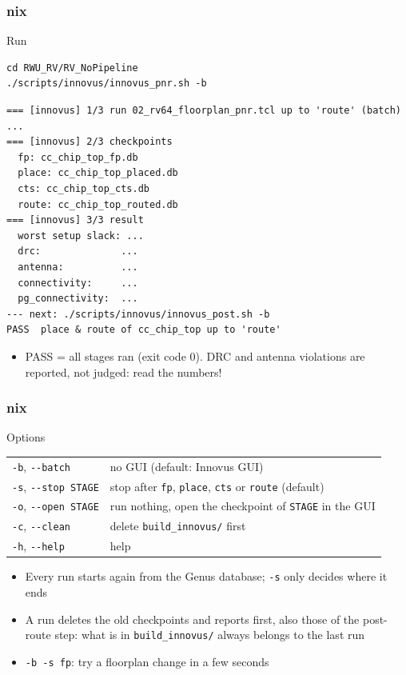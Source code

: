 \documentclass{beamer}
\newcommand{\astitle}{nix}
\newcommand{\assubtitle}{nix}
\newcommand{\cmd}[1]{\texttt{#1}}
\begin{document}
\renewcommand{\assubtitle}{Run}
\begin{frame}[fragile]
\frametitle{\astitle}
\begin{block}{\assubtitle}
  \footnotesize
\begin{lstlisting}[style=sh,basicstyle=\ttfamily\small]
cd RWU_RV/RV_NoPipeline
./scripts/innovus/innovus_pnr.sh -b
\end{lstlisting}
\begin{lstlisting}[style=out]
=== [innovus] 1/3 run 02_rv64_floorplan_pnr.tcl up to 'route' (batch) ...
=== [innovus] 2/3 checkpoints
  fp: cc_chip_top_fp.db
  place: cc_chip_top_placed.db
  cts: cc_chip_top_cts.db
  route: cc_chip_top_routed.db
=== [innovus] 3/3 result
  worst setup slack: ...
  drc:              ...
  antenna:          ...
  connectivity:     ...
  pg_connectivity:  ...
--- next: ./scripts/innovus/innovus_post.sh -b
PASS  place & route of cc_chip_top up to 'route'
\end{lstlisting}
  \begin{itemize}
    \item PASS = all stages ran (exit code 0). DRC and antenna violations
      are reported, not judged: read the numbers!
  \end{itemize}
\end{block}
\end{frame}

\renewcommand{\assubtitle}{Options}
\begin{frame}
\frametitle{\astitle}
\begin{block}{\assubtitle}
  \footnotesize
  \begin{tabularx}{\linewidth}{@{}lY@{}}
    \cmd{-b}, \cmd{-{}-batch}        & no GUI (default: Innovus GUI)\\[2pt]
    \cmd{-s}, \cmd{-{}-stop STAGE}   & stop after \cmd{fp}, \cmd{place},
                                       \cmd{cts} or \cmd{route}
                                       (default)\\[2pt]
    \cmd{-o}, \cmd{-{}-open STAGE}   & run nothing, open the checkpoint of
                                       \cmd{STAGE} in the GUI\\[2pt]
    \cmd{-c}, \cmd{-{}-clean}        & delete \cmd{build\_innovus/} first\\[2pt]
    \cmd{-h}, \cmd{-{}-help}         & help\\
  \end{tabularx}
  \vspace{6pt}
  \begin{itemize}
    \item Every run starts again from the Genus database; \cmd{-s} only
      decides where it ends
    \item A run deletes the old checkpoints and reports first, also those
      of the post-route step: what is in \cmd{build\_innovus/} always
      belongs to the last run
    \item \cmd{-b -s fp}: try a floorplan change in a few seconds
  \end{itemize}
\end{block}
\end{frame}
\end{document}
